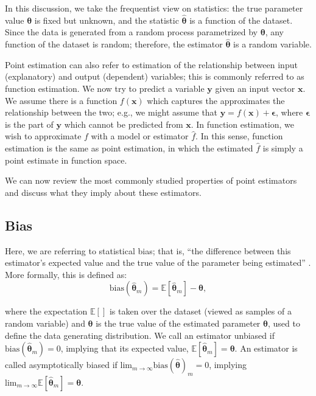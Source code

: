 In this discussion, we take the frequentist view on statistics: the true parameter value $\boldsymbol{\theta}$ is fixed but unknown, and the statistic $\boldsymbol{\hat\theta}$ is a function of the dataset. Since the data is generated from a random process parametrized by $\boldsymbol{\theta}$, any function of the dataset is random; therefore, the estimator $\boldsymbol{\hat\theta}$ is a random variable.

Point estimation can also refer to estimation of the relationship between input (explanatory) and output (dependent) variables; this is commonly referred to as function estimation. We now try to predict a variable $\boldsymbol{y}$ given an input vector $\boldsymbol{x}$. We assume there is a function $f(\boldsymbol{x})$ which captures the approximates the relationship between the two; e.g., we might assume that $\boldsymbol{y} = f(\boldsymbol{x}) + \boldsymbol{\epsilon}$, where $\boldsymbol{\epsilon}$ is the part of $\boldsymbol{y}$ which cannot be predicted from $\boldsymbol{x}$. In function estimation, we wish to approximate $f$ with a model or estimator $\hat f$. In this sense, function estimation is the same as point estimation, in which the estimated $\hat f$ is simply a point estimate in function space.

We can now review the most commonly studied properties of point estimators and discuss what they imply about these estimators.

\subsection{Bias}


Here, we are referring to statistical bias; that is, ``the difference between this estimator's expected value and the true value of the parameter being estimated'' \cite{wikipediaBiasofanestimator2019}. More formally, this is defined as:
\begin{equation}
\text{bias}(\boldsymbol{\hat\theta}_m) = \mathbb{E}[\boldsymbol{\hat\theta}_m] - \boldsymbol{\theta},
\end{equation}

where the expectation $\mathbb{E}[]$ is taken over the dataset (viewed as samples of a random variable) and $\boldsymbol{\theta}$ is the true value of the estimated parameter $\boldsymbol{\theta}$, used to define the data generating distribution. We call an estimator unbiased if $\text{bias}(\boldsymbol{\hat\theta}_m) = 0$, implying that its expected value, $\mathbb{E}[\boldsymbol{\hat\theta}_m] = \boldsymbol{\theta}$. An estimator is called asymptotically biased if $\text{lim}_{m \rightarrow \infty} \text{bias}(\boldsymbol{\hat\theta})_m = 0$, implying $\text{lim}_{m \rightarrow \infty} \mathbb{E}[\boldsymbol{\hat\theta}_m] = \boldsymbol{\theta}$.





